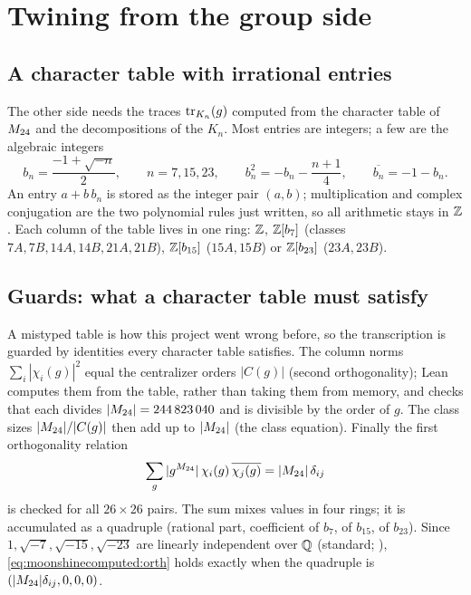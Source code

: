 \section{Twining from the group side}\label{sec:moonshinecomputed:group}

\subsection{A character table with irrational entries}

The other side needs the traces $\operatorname{tr}_{K_n}(g)$ computed from the character table of
$M_{24}$  and the decompositions of the $K_n$. Most
entries are integers; a few are the algebraic integers
\begin{equation}
  b_n=\frac{-1+\sqrt{-n}}{2},\qquad n=7,15,23,\qquad b_n^2=-b_n-\frac{n+1}{4},\qquad
  \overline{b_n}=-1-b_n.
\end{equation}
An entry $a+b\,b_n$ is stored as the integer pair $(a,b)$; multiplication and complex
conjugation are the two polynomial rules just written, so all arithmetic stays in $\mathbb{Z}$.
Each column of the table lives in one ring: $\mathbb{Z}$, $\mathbb{Z}[b_7]$ (classes $7A,7B,14A,14B,21A,
21B$), $\mathbb{Z}[b_{15}]$ ($15A,15B$) or $\mathbb{Z}[b_{23}]$ ($23A,23B$).

\subsection{Guards: what a character table must satisfy}

A mistyped table is how this project went wrong before, so the transcription is guarded
by identities every character table satisfies. The column norms
$\sum_i|\chi_i(g)|^2$ equal the centralizer orders $|C(g)|$ (second orthogonality);
Lean computes them from the table, rather than taking them from memory, and checks that
each divides $|M_{24}|=244\,823\,040$ and is divisible by the order of $g$. The class sizes
$|M_{24}|/|C(g)|$ then add up to $|M_{24}|$ (the class equation). Finally the first
orthogonality relation
\begin{equation}\label{eq:moonshinecomputed:orth}
  \sum_g|g^{M_{24}}|\,\chi_i(g)\,\overline{\chi_j(g)}=|M_{24}|\,\delta_{ij}
\end{equation}
is checked for all $26\times26$ pairs. The sum mixes values in four rings; it is
accumulated as a quadruple (rational part, coefficient of $b_7$, of $b_{15}$, of
$b_{23}$). Since $1,\sqrt{-7},\sqrt{-15},\sqrt{-23}$ are linearly independent over $\mathbb{Q}$
(standard; \TL), \eqref{eq:moonshinecomputed:orth} holds exactly when the quadruple is
$(|M_{24}|\delta_{ij},0,0,0)$.

